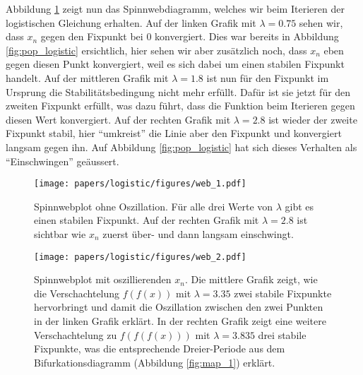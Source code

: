 Abbildung \ref{fig:web_1} zeigt nun das Spinnwebdiagramm,
welches wir beim Iterieren der logistischen Gleichung erhalten.  
Auf der linken Grafik mit $\lambda = 0.75$ sehen wir,
dass $x_n$ gegen den Fixpunkt bei $0$ konvergiert. 
Dies war bereits in Abbildung \ref{fig:pop_logistic} ersichtlich,
hier sehen wir aber zusätzlich noch, dass $x_n$ eben gegen
diesen Punkt konvergiert, weil es sich dabei um einen
stabilen Fixpunkt handelt.  
Auf der mittleren Grafik mit $\lambda = 1.8$ ist nun für den
Fixpunkt im Ursprung die Stabilitätsbedingung nicht
mehr erfüllt. 
Dafür ist sie jetzt für den zweiten Fixpunkt erfüllt, 
was dazu führt, dass die Funktion beim Iterieren gegen 
diesen Wert konvergiert.  
Auf der rechten Grafik mit $\lambda = 2.8$ ist wieder der  
zweite Fixpunkt stabil, hier ``umkreist'' die Linie aber
den Fixpunkt und konvergiert langsam gegen ihn. 
Auf Abbildung \ref{fig:pop_logistic} hat sich dieses Verhalten
als ``Einschwingen'' geäussert.
%
\begin{figure}[h!]
    \texttt{[image: papers/logistic/figures/web\_1.pdf]}
    \caption{
        Spinnwebplot ohne Oszillation.
        Für alle drei Werte von $\lambda$ gibt es 
        einen stabilen Fixpunkt. 
        Auf der rechten Grafik mit $\lambda = 2.8$
        ist sichtbar wie $x_n$ 
        zuerst über- und dann langsam einschwingt.
    }
    \label{fig:web_1}
\end{figure}
\begin{figure}[h!]
    \texttt{[image: papers/logistic/figures/web\_2.pdf]}
    \caption{
        Spinnwebplot mit oszillierenden $x_n$. 
        Die mittlere Grafik zeigt, wie 
        die Verschachtelung $f(f(x))$ mit 
        $\lambda = 3.35$ zwei
        stabile Fixpunkte hervorbringt und 
        damit die Oszillation zwischen
        den zwei Punkten in der linken Grafik erklärt.
        In der rechten Grafik zeigt eine weitere 
        Verschachtelung zu $f(f(f(x)))$
        mit $\lambda = 3.835$ 
        drei stabile Fixpunkte, was
        die entsprechende Dreier-Periode aus dem 
        Bifurkationsdiagramm (Abbildung \ref{fig:map_1})
        erklärt. 
    }
    \label{fig:web_2}
\end{figure}


